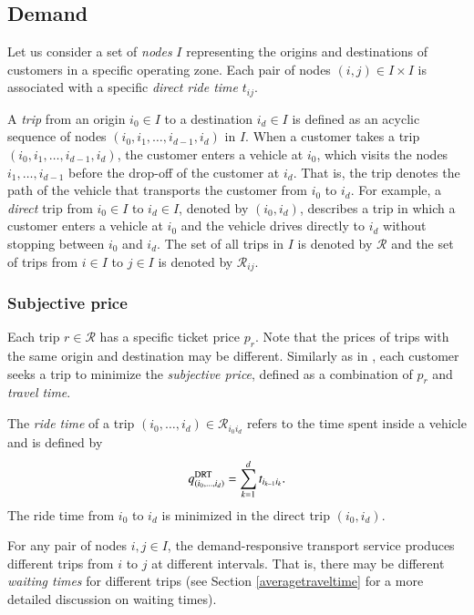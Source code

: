 \documentclass[dissertation,draft*]{aaltoseries}
\begin{document}
\subsection{Demand}
\label{demand}
Let us consider a set of \emph{nodes} $I$ representing the origins and destinations of customers in a specific operating zone.
Each pair of nodes $(i,j) \in I \times I$ is associated with a specific \emph{direct ride time} $t_{ij}$.

A \emph{trip} from an origin $i_0 \in I$ to a destination $i_d \in I$ is defined as an acyclic sequence of nodes 
$(i_0,i_1,\ldots,i_{d-1},i_d)$ in $I$.
When a customer takes a trip $(i_0,i_1,\ldots,i_{d-1},i_d)$, the customer enters a vehicle at $i_0$, which
visits the nodes $i_1,\ldots,i_{d-1}$ before the drop-off of the customer at $i_d$. That is, the
trip denotes the path of the vehicle that transports the customer from $i_0$ to $i_d$.
For example, a \emph{direct} trip from $i_0 \in I$ to $i_d \in I$, denoted by $(i_0,i_d)$, describes a trip in which a customer enters 
a vehicle at $i_0$ and the vehicle drives directly to $i_d$ without stopping between $i_0$ and $i_d$. 
The set of all trips in $I$ is denoted by $\mathcal{R}$ and the set of trips from $i\in I$ to $j \in I$ is denoted by $\mathcal{R}_{ij}$.

\subsubsection{Subjective price}
Each trip $r \in \mathcal{R}$ has a specific ticket price $p_r$. 
Note that the prices of trips with the same origin and destination may be different.
Similarly as in \citep{yang2010}, each customer seeks a trip to minimize the \emph{subjective price}, 
defined as a combination of $p_r$ and \emph{travel time}. 

The \emph{ride time} of a trip $(i_0,\ldots,i_d) \in \mathcal{R}_{i_0i_d}$ 
refers to the time spent inside a vehicle and is defined by
\begin{align}
\label{ridetime}
q_{(i_0,\ldots,i_d)}^{\rm DRT} = \sum_{k=1}^{d} t_{i_{k-1}i_{k}}.
\end{align}
The ride time from $i_0$ to $i_d$ is minimized in the direct trip $(i_0,i_d)$. 

For any pair of nodes $i,j \in I$,
the demand-responsive transport service produces different trips from $i$ to $j$ at different intervals.
That is, there may be different \emph{waiting times} for different trips
(see Section \ref{averagetraveltime} for a more detailed discussion on waiting times).
\end{document}
